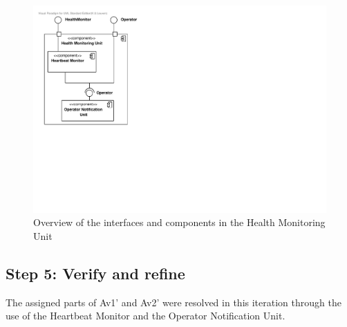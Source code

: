 \begin{figure}[H]
	\begin{centering}
		\includegraphics[width=\textwidth]{figs/add-it9-interfaces.pdf}
		\caption{Overview of the interfaces and components in the Health Monitoring
		Unit}
		\label{fig:it9/interfaces}
	\end{centering}
\end{figure}

\subsection{Step 5: Verify and refine}
\label{add:it9/verification}

\npar The assigned parts of Av1' and Av2' were resolved in this iteration
through the use of the Heartbeat Monitor and the Operator Notification Unit.
